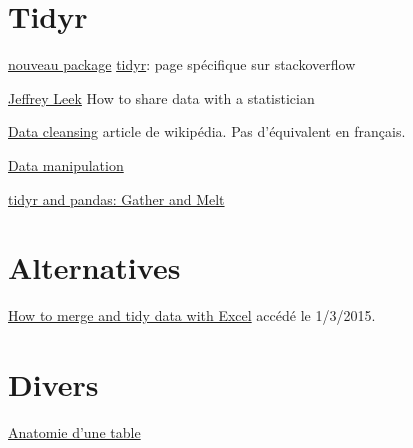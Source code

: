 \documentclass[]{article}
\begin{document}
\section{Tidyr}\label{tidyr}

\href{http://blog.rstudio.org/2014/07/22/introducing-tidyr/}{nouveau
package}
\href{http://stackoverflow.com/search?tab=votes\&q={[}r{]}\%20tidyr}{tidyr}:
page spécifique sur stackoverflow

\href{https://github.com/jtleek/datasharing}{Jeffrey Leek} How to share
data with a statistician

\href{http://en.wikipedia.org/wiki/Data_cleansing}{Data cleansing}
article de wikipédia. Pas d'équivalent en français.

\href{http://dh-r.lincolnmullen.com/data.html}{Data manipulation}

\href{http://connor-johnson.com/2014/08/28/tidyr-and-pandas-gather-and-melt/}{tidyr
and pandas: Gather and Melt}

\section{Alternatives}\label{alternatives}

\href{http://www.ttdatavis.onthinktanks.org/how-tos/how-to-merge-and-tidy-data-with-excel}{How
to merge and tidy data with Excel} accédé le 1/3/2015.

\section{Divers}\label{divers-1}

\href{http://www.datakind.org/blog/whats-in-a-table/}{Anatomie d'une
table}
\end{document}
